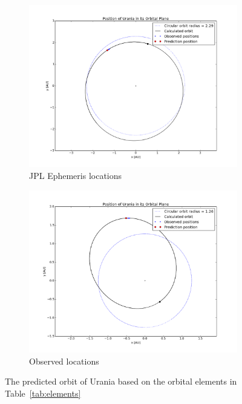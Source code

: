 \documentclass[a4paper,12pt]{article}
\begin{document}
\begin{figure}[!htbp]
\centering
\begin{subfigure}{0.5\textwidth}
  \centering
  \includegraphics[width=\linewidth]{JPLOrbitalPlane.png}
  \caption{JPL Ephemeris locations}
  \label{fig:JPLOrbit}
\end{subfigure}%
\begin{subfigure}{0.5\textwidth}
  \centering
  \includegraphics[width=\linewidth]{UraniaOrbitalPlane.png}
  \caption{Observed locations}
  \label{fig:UraniaOrbit}
\end{subfigure}
\caption{The predicted orbit of Urania based on the orbital elements in Table~\ref{tab:elements}}
\label{fig:Orbit}
\end{figure}
\end{document}
